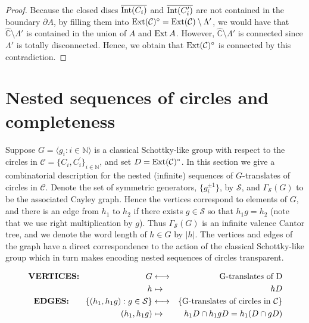 \documentclass[12pt]{amsart}
\theoremstyle{plain}
\DeclareMathOperator{\Int}{\rm Int}
\DeclareMathOperator{\Ext}{\rm Ext}
\begin{document}
\begin{proof}
Because the closed discs 
$\overline{\Int(C_i)}$ and $\overline{\Int(C'_i)}$ are not contained in
the boundary $\partial A$, by filling them into $\Ext (\mathcal{C})^{\circ}=\Ext (\mathcal{C}) \setminus \Lambda'$,
 we would have that $\widehat{\mathbb C} \setminus \Lambda'$ is contained 
 in the union of $A$ and $\Ext A$.
 However, $\widehat{\mathbb C} \setminus \Lambda'$ is connected since $\Lambda'$ is totally disconnected.
 Hence, we obtain that $\Ext (\mathcal{C})^{\circ}$ is connected by this contradiction.
 \end{proof}
 
  
 
 \section{Nested sequences of  circles and completeness}
\label{sec: nest sequences}
 Suppose $G=\langle g_i: i \in \mathbb N \rangle$ is a classical Schottky-like group with respect to the circles in $\mathcal{C}=\{C_i ,C_i ^{\prime}\}_{i \in \mathbb N}$, and set $D=\Ext (\mathcal{C})^{\circ}$. In this section we give a combinatorial description  for the nested (infinite) sequences of $G$-translates of circles in  
 $\mathcal{C}$. Denote the set of symmetric generators, $\{g_i^{\pm 1}\}$, by  $\mathcal{S}$, and 
 $\Gamma_{\mathcal{S}} (G)$ to be  the  associated  Cayley graph.  Hence the vertices correspond to elements of $G$, and there is an edge from  $h_1$ to  $h_2$ if there exists 
 $g \in \mathcal{S}$ so that  $h_1 g=h_2$ (note that we use right multiplication by $g$). Thus 
 $\Gamma_{\mathcal{S}} (G)$ is an infinite valence Cantor tree, and we denote the word length of $h \in G$ by $|h|$. 
  The vertices and edges  of the graph have a direct correspondence to the action of the classical Schottky-like group which in turn  makes encoding nested sequences of circles transparent. 
  
  \begin{eqnarray*}
\text{{\bf VERTICES:}} \qquad \qquad \qquad \qquad  G& \longleftrightarrow & 
\text{G-translates of D} \\
h& \mapsto& hD \\
\text{{\bf EDGES:}} 
\qquad \{(h_1, h_1g):  g \in \mathcal{S}\}& 
\longleftrightarrow & 
\{\text{G-translates of circles in $\mathcal{C}$} \}\\
(h_1, h_1 g)& \mapsto& h_1D \cap h_1gD=h_1(D \cap gD) \\
\end{eqnarray*}
\end{document}
